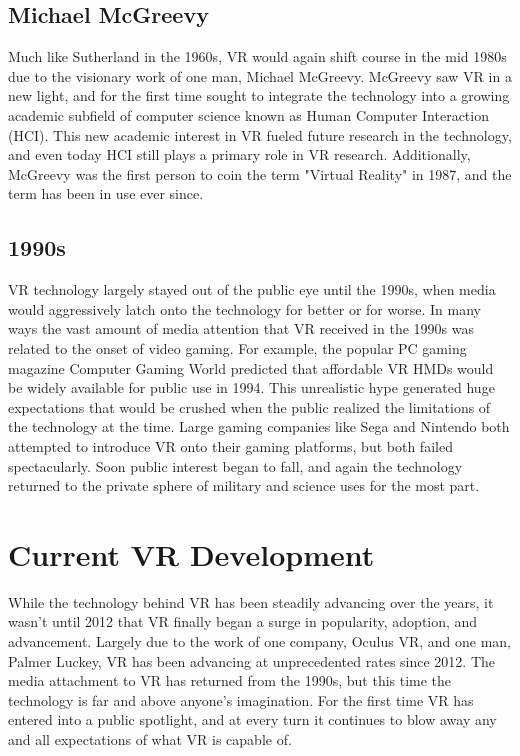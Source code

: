 \subsection{Michael McGreevy}
\label{sec:history4}

Much like Sutherland in the 1960s, VR would again shift course in the mid 1980s due to the visionary work of one man, Michael McGreevy. McGreevy saw VR in a new light, and for the first time sought to integrate the technology into a growing academic subfield of computer science known as Human Computer Interaction (HCI). This new academic interest in VR fueled future research in the technology, and even today HCI still plays a primary role in VR research. Additionally, McGreevy was the first person to coin the term "Virtual Reality" in 1987, and the term has been in use ever since.

\subsection{1990s}
\label{sec:history5}

VR technology largely stayed out of the public eye until the 1990s, when media would aggressively latch onto the technology for better or for worse. In many ways the vast amount of media attention that VR received in the 1990s was related to the onset of video gaming. For example, the popular PC gaming magazine Computer Gaming World predicted that affordable VR HMDs would be widely available for public use in 1994. This unrealistic hype generated huge expectations that would be crushed when the public realized the limitations of the technology at the time. Large gaming companies like Sega and Nintendo both attempted to introduce VR onto their gaming platforms, but both failed spectacularly. Soon public interest began to fall, and again the technology returned to the private sphere of military and science uses for the most part.

\section{Current VR Development}
\label{sec:vrinnovations}

While the technology behind VR has been steadily advancing over the years, it wasn't until 2012 that VR finally began a surge in popularity, adoption, and advancement. Largely due to the work of one company, Oculus VR, and one man, Palmer Luckey, VR has been advancing at unprecedented rates since 2012. The media attachment to VR has returned from the 1990s, but this time the technology is far and above anyone's imagination. For the first time VR has entered into a public spotlight, and at every turn it continues to blow away any and all expectations of what VR is capable of.


